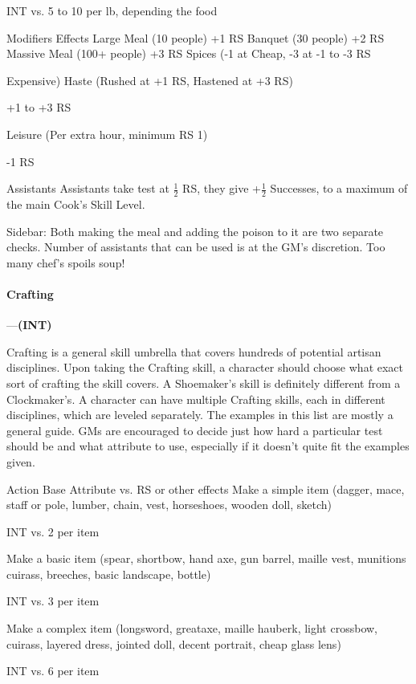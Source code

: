 \documentclass[oneside,11pt,english]{book}
\begin{document}
INT vs. 5 to 10 per lb, depending the food 

Modifiers Effects 
Large Meal (10 people) +1 RS 
Banquet (30 people) +2 RS 
Massive Meal (100+ people) +3 RS 
Spices (-1 at Cheap, -3 at -1 to -3 RS 


Expensive) 
Haste (Rushed at +1 RS, 
Hastened at +3 RS) 

+1 to +3 RS 

Leisure (Per extra hour, 
minimum RS 1) 

-1 RS 

Assistants Assistants take test at $ \frac{1}{2} $ RS, they give +$ \frac{1}{2} $ Successes, to a maximum 
of the main Cook’s Skill Level. 

 
Sidebar: 
Both making the meal and adding the poison to it are two separate checks. 
Number of assistants that can be used is at the GM’s discretion. Too many chef’s spoils soup! 

 

\paragraph{\label{skill:Crafting}Crafting}---\quad\textbf{(INT) }\par
Crafting is a general skill umbrella that covers hundreds of potential artisan disciplines. Upon taking the Crafting skill, a character should choose what exact sort of crafting the skill covers. A Shoemaker’s skill is definitely different from a Clockmaker’s. A character can have multiple Crafting skills, each in different disciplines, which are leveled separately. The examples in this list are mostly a general guide. GMs are encouraged to decide just how hard a particular test should be and what attribute to use, especially if it doesn’t quite fit the examples given. 


Action Base Attribute vs. RS or other effects 
Make a simple item (dagger, mace, staff or pole, 
lumber, chain, vest, horseshoes, wooden doll, sketch) 

INT vs. 2 per item 

Make a basic item (spear, shortbow, hand axe, gun 
barrel, maille vest, munitions cuirass, breeches, basic 
landscape, bottle) 

INT vs. 3 per item 

Make a complex item (longsword, greataxe, maille 
hauberk, light crossbow, cuirass, layered dress, 
jointed doll, decent portrait, cheap glass lens) 

INT vs. 6 per item 
\end{document}
